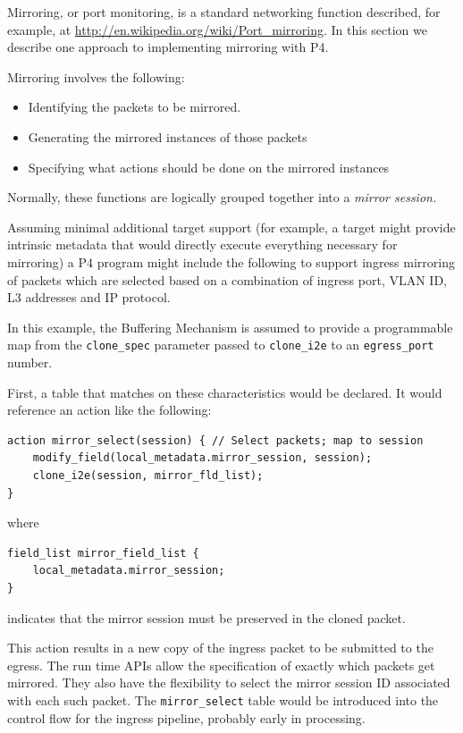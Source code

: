 \documentclass[12pt]{article}
\begin{document}

Mirroring, or port monitoring, is a standard networking function described,
for example, at \url{http://en.wikipedia.org/wiki/Port_mirroring}.
In this section
we describe one approach to implementing mirroring with P4.

Mirroring involves the following:

\begin{itemize}
\item
Identifying the packets to be mirrored.
\item
Generating the mirrored instances of those packets
\item
Specifying what actions should be done on the mirrored instances
\end{itemize}


Normally, these functions are logically grouped together into a \textit{mirror session.}

Assuming minimal additional target support (for example, a target might provide
intrinsic metadata that would directly execute everything necessary for mirroring)
a P4 program might include the following to support ingress mirroring of packets
which are selected based on a combination of ingress port, VLAN ID, L3 addresses
and IP protocol.

In this example, the Buffering Mechanism is assumed to provide a programmable
map from the \texttt{clone_spec} parameter passed to \texttt{clone_i2e} to an \texttt{egress_port} number.

First, a table that matches on these characteristics would be declared. It
would reference an action like the following:

\begin{lstlisting}[keywords={},frame=single,escapechar=\@]
action mirror_select(session) { // Select packets; map to session
    modify_field(local_metadata.mirror_session, session);
    clone_i2e(session, mirror_fld_list);
}
\end{lstlisting}

where

\begin{lstlisting}[keywords={},frame=single,escapechar=\@]
field_list mirror_field_list {
    local_metadata.mirror_session;
}
\end{lstlisting}


indicates that the mirror session must be preserved in the cloned packet.

This action results in a new copy of the ingress packet to be submitted to
the egress. The run time APIs allow the specification of exactly which packets
get mirrored. They also have the flexibility to select the mirror session
ID associated with each such packet. The \texttt{mirror_select} table would be introduced
into the control flow for the ingress pipeline, probably early in processing.
\end{document}
